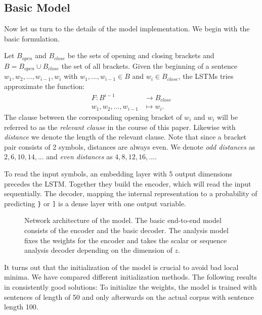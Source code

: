 \documentclass[11pt,a4paper]{article}
\begin{document}
\subsection{Basic Model}

Now let us turn to the details of the model implementation.  We begin with the basic formulation.

Let $B_{open}$ and $B_{close}$ be the sets of opening and closing brackets and $B = B_{open} \cup B_{close}$ the set of all brackets. Given the beginning of a sentence $w_1, w_2, ..., w_{i-1}, w_i$ with $w_1, ..., w_{i-1} \in B$ and $w_i \in B_{close}$, the LSTMs tries approximate the function:
%
\begin{align*}
  F \colon B^{i-1} &\to B_{close}\\
  w_1, w_2, ..., w_{i-1} &\mapsto w_i.
  \label{eq:brackets_task_definition}
\end{align*}
%
The clause between the corresponding opening bracket of $w_i$ and $w_i$ will be referred to as the \emph{relevant clause} in the course of this paper. Likewise with \emph{distance} we denote the length of the relevant clause. Note that since a bracket pair consists of 2 symbols, distances are always even. We denote \emph{odd distances} as ${2,6,10,14,...}$ and \emph{even distances} as ${4,8,12,16,...}$.

To read the input symbols, an embedding layer with 5 output dimensions precedes the LSTM. Together they build the encoder, which will read the input sequentially. The decoder, mapping the internal representation to a probability of predicting \verb|}| or \verb|]| is a dense layer with one output variable.

\begin{figure*}[ht]
    \centering
    
    \caption{Network architecture of the model. The basic end-to-end model consists of the encoder and the basic decoder. The analysis model fixes the weights for the encoder and takes the scalar or sequence analysis decoder depending on the dimension of $z$.}
    \label{fig:lstm_architecture}
\end{figure*}

It turns out that the initialization of the model is crucial to avoid bad local minima. We have compared different initialization methods. The following results in consistently good solutions: To initialize the weights, the model is trained with sentences of length of 50 and only afterwards on the actual corpus with sentence length 100.
\end{document}
